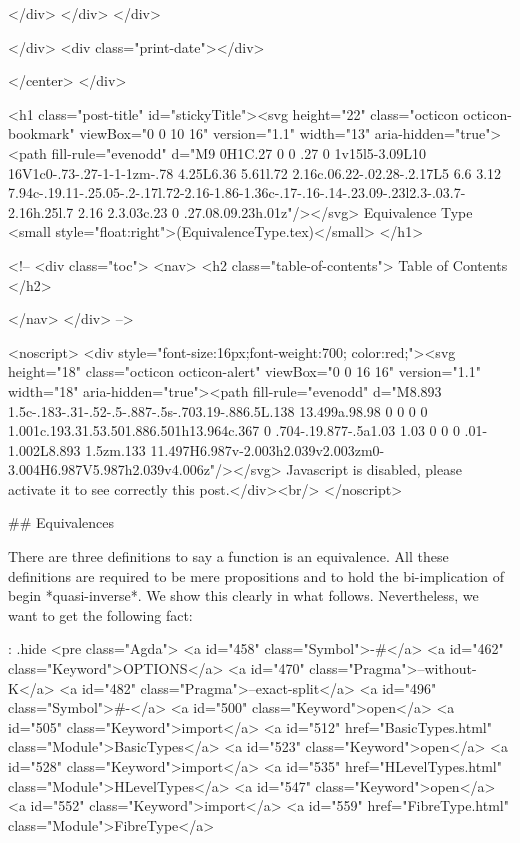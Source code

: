                 </div>
            </div>
          </div>
          
          
        </div>
        <div class="print-date"></div>
        
        
    </center>
  </div>

  

  <h1 class="post-title" id="stickyTitle"><svg height="22" class="octicon octicon-bookmark" viewBox="0 0 10 16" version="1.1" width="13" aria-hidden="true"><path fill-rule="evenodd" d="M9 0H1C.27 0 0 .27 0 1v15l5-3.09L10 16V1c0-.73-.27-1-1-1zm-.78 4.25L6.36 5.61l.72 2.16c.06.22-.02.28-.2.17L5 6.6 3.12 7.94c-.19.11-.25.05-.2-.17l.72-2.16-1.86-1.36c-.17-.16-.14-.23.09-.23l2.3-.03.7-2.16h.25l.7 2.16 2.3.03c.23 0 .27.08.09.23h.01z"/></svg> Equivalence Type <small style="float:right">(EquivalenceType.tex)</small>
  </h1>

  <!-- 
  <div class="toc">
    <nav>
    <h2 class="table-of-contents"> Table of Contents </h2>
      

    </nav>
  </div>
   -->

  <noscript>
  <div style="font-size:16px;font-weight:700; color:red;"><svg height="18" class="octicon octicon-alert" viewBox="0 0 16 16" version="1.1" width="18" aria-hidden="true"><path fill-rule="evenodd" d="M8.893 1.5c-.183-.31-.52-.5-.887-.5s-.703.19-.886.5L.138 13.499a.98.98 0 0 0 0 1.001c.193.31.53.501.886.501h13.964c.367 0 .704-.19.877-.5a1.03 1.03 0 0 0 .01-1.002L8.893 1.5zm.133 11.497H6.987v-2.003h2.039v2.003zm0-3.004H6.987V5.987h2.039v4.006z"/></svg> Javascript is disabled, please activate it to see correctly this post.</div><br/>
  </noscript>

  ## Equivalences

There are three definitions to say a function is an equivalence. All these
definitions are required to be mere propositions and to hold the
bi-implication of begin *quasi-inverse*. We show this clearly in what follows.
Nevertheless, we want to get the following fact:


{: .hide}
<pre class="Agda">
<a id="458" class="Symbol">{-#</a> <a id="462" class="Keyword">OPTIONS</a> <a id="470" class="Pragma">--without-K</a> <a id="482" class="Pragma">--exact-split</a> <a id="496" class="Symbol">#-}</a>
<a id="500" class="Keyword">open</a> <a id="505" class="Keyword">import</a> <a id="512" href="BasicTypes.html" class="Module">BasicTypes</a>
<a id="523" class="Keyword">open</a> <a id="528" class="Keyword">import</a> <a id="535" href="HLevelTypes.html" class="Module">HLevelTypes</a>
<a id="547" class="Keyword">open</a> <a id="552" class="Keyword">import</a> <a id="559" href="FibreType.html" class="Module">FibreType</a>


